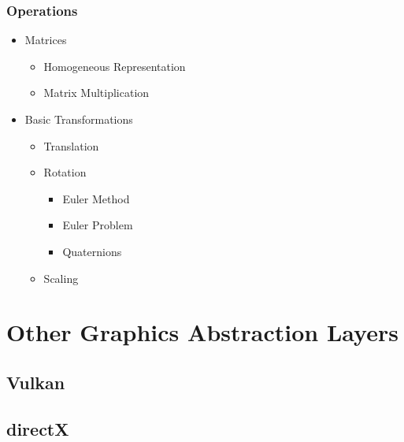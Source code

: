             \subsubsection*{Operations}
              \begin{itemize}
                \item Matrices
                \begin{itemize}
                  \item Homogeneous Representation
                  \item Matrix      Multiplication
                \end{itemize}

                \item Basic Transformations
                \begin{itemize}
                    \item Translation
                    \item Rotation
                    \begin{itemize}
                        \item Euler Method
                        \item Euler Problem
                        \item Quaternions
                    \end{itemize}
                    \item Scaling
                \end{itemize}
                \end{itemize}


    \section*{Other Graphics Abstraction Layers}
        \subsection*{Vulkan}
        \subsection*{directX}




